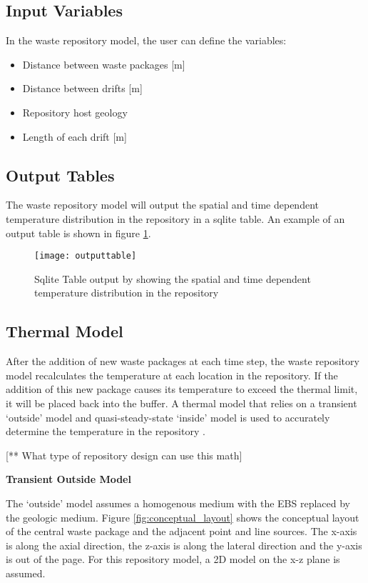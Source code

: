 \subsection{Input Variables}

In the waste repository model, the user can define the variables: 
	\begin{itemize}
		\item Distance between waste packages [m]
		\item Distance between drifts [m]
		\item Repository host geology 
		\item Length of each drift [m]
	\end{itemize}
	
\subsection{Output Tables}
The waste repository model will output the spatial and time 
dependent temperature distribution in the repository in a sqlite 
table. An example of an output table is shown in figure 
\ref{fig:outputtable}. 

\begin{figure}[h]
	\texttt{[image: outputtable]}
	\caption{Sqlite Table output by \Cyclus showing the spatial and 
	time dependent temperature distribution in the repository}
    \label{fig:outputtable}
\end{figure}

\subsection{Thermal Model}
After the addition of new waste packages at each time step, the 
waste repository model recalculates the temperature at each location
in the repository. 
If the addition of this new package causes its temperature to exceed
the thermal limit, it will be placed back into the buffer. 
A thermal model that relies on a transient `outside' model and 
quasi-steady-state `inside' model is used to accurately determine 
the temperature in the repository \cite{sutton_investigations_2011}.

[** What type of repository design can use this math]

\noindent
\textbf{Transient Outside Model}

The `outside' model assumes a homogenous medium with the \gls{EBS} 
replaced by the geologic medium. 
Figure \ref{fig:conceptual_layout} shows the conceptual layout of 
the central waste package and the adjacent point and line sources. 
The x-axis is along the axial direction, the z-axis is along the 
lateral direction and the y-axis is out of the page. 
For this repository model, a 2D model on the x-z plane is assumed. 

